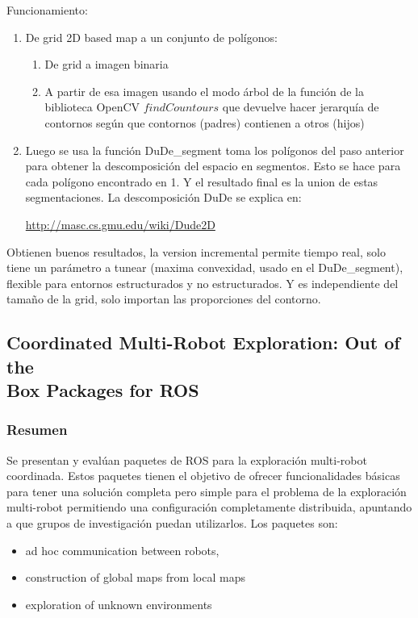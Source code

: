 Funcionamiento:
\begin{enumerate}
  \item De grid 2D based map a un conjunto de polígonos:
  \begin{enumerate}
     \item De grid a imagen binaria
     \item A partir de esa imagen usando el modo árbol de la función de la biblioteca OpenCV $findCountours$ que devuelve hacer jerarquía de contornos según que contornos (padres) contienen a otros (hijos)
  \end{enumerate}
\item Luego se usa la función DuDe\_segment toma los polígonos del paso anterior para obtener la descomposición del espacio en segmentos. Esto se hace para cada polígono encontrado en 1. Y el resultado final es la union de estas segmentaciones. La descomposición DuDe se explica en: 

  \url{http://masc.cs.gmu.edu/wiki/Dude2D}
\end{enumerate}

Obtienen buenos resultados, la version incremental permite tiempo real, solo tiene un parámetro a tunear (maxima convexidad, usado en el DuDe\_segment), flexible para entornos estructurados y no estructurados. Y es independiente del tamaño de la grid, solo importan las proporciones del contorno.

\subsection[Coordinated Multi-Robot Exploration: Out of the Box Packages for ROS]{Coordinated Multi-Robot Exploration: Out of the\\ Box Packages for ROS}
\subsubsection{Resumen}
Se presentan y evalúan paquetes de ROS para la exploración multi-robot coordinada. Estos paquetes tienen el objetivo de ofrecer funcionalidades básicas para tener una solución completa pero simple para el problema de la exploración multi-robot permitiendo una configuración completamente distribuida, apuntando a que grupos de investigación puedan utilizarlos. Los paquetes son:
\begin{itemize}
  \item ad hoc communication between robots,
  \item construction of global maps from local maps
  \item exploration of unknown environments
\end{itemize}

